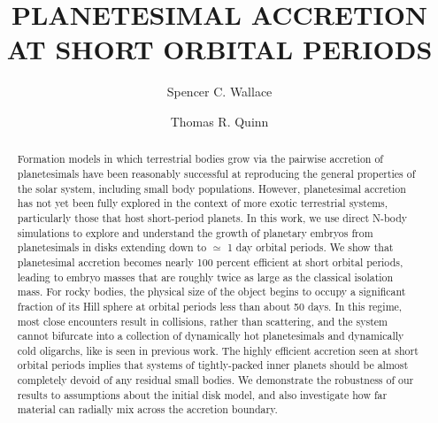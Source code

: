 \documentclass[twocolumn]{aastex63}
\begin{document}
\title{PLANETESIMAL ACCRETION AT SHORT ORBITAL PERIODS}

\author{Spencer C. Wallace}

\author{Thomas R. Quinn}

\begin{abstract}
Formation models in which terrestrial bodies grow via the pairwise accretion of planetesimals have been reasonably successful at reproducing the general properties of the solar system, including small body populations. However, planetesimal accretion has not yet been fully explored in the context of more exotic terrestrial systems, particularly those that host short-period planets. In this work, we use direct N-body simulations to explore and understand the growth of planetary embryos from planetesimals in disks extending down to $\simeq$ 1 day orbital periods. We show that planetesimal accretion becomes nearly 100 percent efficient at short orbital periods, leading to embryo masses that are roughly twice as large as the classical isolation mass. For rocky bodies, the physical size of the object begins to occupy a significant fraction of its Hill sphere at orbital periods less than about 50 days. In this regime, most close encounters result in collisions, rather than scattering, and the system cannot bifurcate into a collection of dynamically hot planetesimals and dynamically cold oligarchs, like is seen in previous work. The highly efficient accretion seen at short orbital periods implies that systems of tightly-packed inner planets should be almost completely devoid of any residual small bodies. We demonstrate the robustness of our results to assumptions about the initial disk model, and also investigate how far material can radially mix across the accretion boundary.
\end{abstract}
\end{document}
